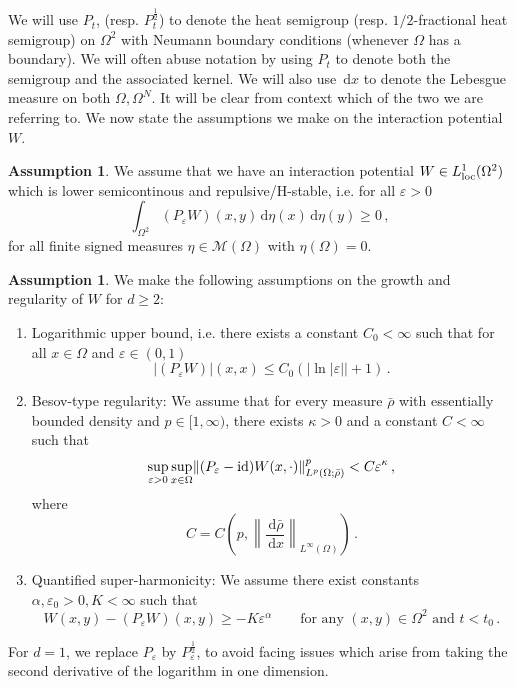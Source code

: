 \documentclass[a4paper,10pt,twoside]{amsart}
\newcommand{\dx}[1]{\,\mathrm{d}#1}  %
\theoremstyle{remark}
\theoremstyle{definition}
\newtheorem{assumption}[theorem]{Assumption}
\numberwithin{equation}{section}
\newcommand{\eps}{\varepsilon}
\newcommand{\id}{{\rm id}}
\newcommand{\0}{{\bf 0}}
\newcommand{\+}{\hspace{-.5ex}+\hspace{-.5ex}}
\begin{document}
We will use $P_t$, (resp. $P_t^{\frac 12}$) to denote the heat semigroup (resp. $1/2$-fractional heat semigroup) on $\Omega^2$ with Neumann boundary conditions (whenever $\Omega$ has a boundary). We will often abuse notation by using $P_t$ to denote both the semigroup and the associated kernel. We will also use $\dx{x}$ to denote the Lebesgue measure on both $\Omega,\Omega^N$. It will be clear from context which of the two we are referring to.  We now state the assumptions we make on the interaction potential $W$. 

\begin{assumption}
  \label{ass:potential0}
  We assume that we have an interaction potential $W \in L^1_{\rm loc}(\Omega^2)$ which is lower semicontinous and repulsive/H-stable, i.e. for all $\eps>0$
\begin{equation}
\int_{\Omega^2}(P_\eps W)(x,y)\dx{\eta}(x)\dx{\eta}(y)\geq 0 \, ,
\end{equation}
for all finite signed measures $\eta \in \mathcal{M}(\Omega)$ with $\eta(\Omega)=0$. 
\end{assumption}
\begin{assumption}\label{ass:potential}
We  make the following assumptions on the growth and regularity of $W$ for $d\geq 2$:
\begin{enumerate}
\item Logarithmic upper bound, i.e. there exists a constant $C_0<\infty$ such that for all $x \in \Omega$ and $\eps \in (0,1)$
\begin{equation}
|(P_\eps W)|(x,x)\leq C_0(|\ln|\eps||+1)\, .
\label{eq:logarithmicbound}
\end{equation}
\item Besov-type regularity: We assume that for every measure $\bar{\rho}$ with essentially bounded density and $p \in [1,\infty)$, there exists $\kappa>0$ and a constant $C<\infty$ such that
\begin{equation}
\sup_{\eps> 0}\sup_{x\in \Omega}\lVert (P_\eps- \id)W(x,\cdot) \rVert^p_{L^p(\Omega;\bar{\rho})} < C \eps^{\kappa} \, ,
\label{eq:Besovestimate}
\end{equation}
where
\begin{equation}
  C=C\left(p,\left \lVert\frac{\dx{\bar{\rho}}}{\dx{x}} \right \rVert_{L^\infty(\Omega)}\right)\, .
\end{equation}
\item Quantified super-harmonicity: We assume there exist constants $\alpha,\eps_0>0,K<\infty$ such that
\begin{equation}\label{superharmonicity}
W(x,y)-(P_\eps W)(x,y)\ge -K \eps^\alpha \qquad\mbox{for any $(x,y)\in\Omega^2$ and $t<t_0$} \, .
\end{equation}
\end{enumerate}
For $d=1$, we replace $P_\eps$ by $P_\eps^{\frac 12}$, to avoid facing issues which arise from taking the second derivative of the logarithm in one dimension.
\end{assumption}
\end{document}
